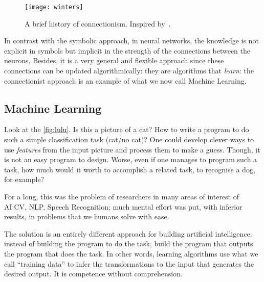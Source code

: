 \begin{figure}
	[ht!] \centering
	\texttt{[image: winters]}
	\caption{A brief history of connectionism. Inspired by~.}\label{fig:connectionism}
\end{figure}
In contrast with the symbolic approach, in neural networks, the knowledge is not explicit in symbols but implicit in the strength of the connections between the neurons. Besides, it is a very general and flexible approach since these connections can be updated algorithmically: they are algorithms that \emph{learn}: the connectionist approach is an example of what we now call Machine Learning.


\subsection{Machine Learning}

Look at the \cref{fig:lulu}. Is this a picture of a cat? How to write a program to do such a simple classification task (cat/no cat)? One could develop clever ways to use \emph{features} from the input picture and process them to make a guess. Though, it is not an easy program to design. Worse, even if one manages to program such a task, how much would it worth to accomplish a related task, to recognise a dog, for example?

For a long, this was the problem of researchers in many areas of interest of AI:\@ \acf{CV}, \acf{NLP}, Speech Recognition; much mental effort was put, with inferior results, in problems that we humans solve with ease.

The solution is an entirely different approach for building artificial intelligence: instead of building the program to do the task, build the program that outputs the program that does the task. In other words, learning algorithms use what we call ``training data'' to infer the transformations to the input that generates the desired output. It is competence without comprehension.

